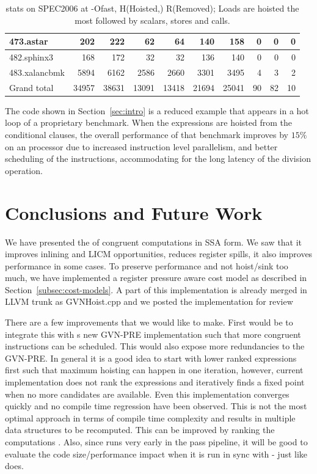 \documentclass[acmlarge,review,anonymous]{acmart}\settopmatter{printfolios=true}
\begin{document}
\begin{table}[h!]
\begin{center}
{\begin{tabular}{|l|r|r|r|r|r|r|r|r|r|}
 473.astar	  &  202	& 222	  &  62	  & 64	   & 140	& 158		& 0	& 0	& 0		\\\hline
 482.sphinx3	  &  168	& 172	  &  32	  & 32	   & 136	& 140		& 0	& 0	& 0		\\\hline
 483.xalancbmk	  &  5894	& 6162	  &  2586 & 2660   & 3301	& 3495		& 4	& 3	& 2	        \\\hline
 Grand total      &34957	&38631	  &13091  &13418   &21694	&25041	        &90	&82     &10             \\\hline
    \end{tabular}}
  \end{center}
  \caption{\GCM{} stats on SPEC2006 at -Ofast, H(Hoisted,) R(Removed); Loads are
    hoisted the most followed by scalars, stores and calls.}
  \label{tab:code-motion-metric}
\end{table}

The code shown in Section~\ref{sec:intro} is a reduced example that appears in a
hot loop of a proprietary benchmark.  When the expressions are hoisted from the
conditional clauses, the overall performance of that benchmark improves by
$15\%$ on an \ooo{} processor due to increased instruction level
parallelism, and better scheduling of the instructions, accommodating for the
long latency of the division operation.

\section{Conclusions and Future Work}
\label{sec:future-work}

We have presented the \gcm{} of congruent computations in SSA form. We saw that
it improves inlining and LICM opportunities, reduces register spills, it also
improves performance in some cases. To preserve performance and not hoist/sink
too much, we have implemented a register pressure aware cost model as described
in Section~\ref{subsec:cost-models}. A part of this implementation is already
merged in LLVM trunk as GVNHoist.cpp and we posted the \GCM{} implementation for
review

There are a few improvements that we would like to make. First would be to
integrate this with s new GVN-PRE implementation such that more
congruent instructions can be scheduled. This would also expose more
redundancies to the GVN-PRE.  In general it is a good idea to start with lower
ranked expressions first such that maximum hoisting can happen in one iteration,
however, current implementation does not rank the expressions and iteratively
finds a fixed point when no more candidates are available. Even this
implementation converges quickly and no compile time regression have been
observed. This is not the most optimal approach in terms of compile time complexity
and results in multiple data structures to be recomputed. This can be improved
by ranking the computations \cite{rosen1988global}. Also, since \GCM{} runs very
early in the pass pipeline, it will be good to evaluate the code size/performance
impact when it is run in sync with \GVN{}-\PRE{} just like \GCC{} does.
\end{document}

